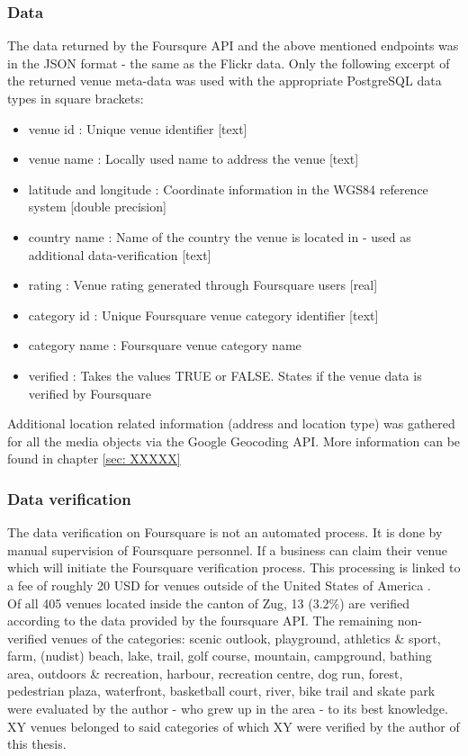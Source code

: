 \subsubsection{Data} \label{fq_data}
The data returned by the Foursqure API and the above mentioned endpoints was in the JSON format - the same as the Flickr data.
Only the following excerpt of the returned venue meta-data was used with the appropriate PostgreSQL data types in square brackets: \\
\begin{itemize}
    \item venue id : Unique venue identifier [text]
    \item venue name : Locally used name to address the venue [text]
    \item latitude and longitude : Coordinate information in the WGS84 reference system [double precision]
    \item country name : Name of the country the venue is located in - used as additional data-verification [text]
    \item rating : Venue rating generated through Foursquare users [real]
    \item category id : Unique Foursquare venue category identifier [text]
    \item category name : Foursquare venue category name
    \item verified : Takes the values TRUE or FALSE. States if the venue data is verified by Foursquare
\end{itemize}

Additional location related information (address and location type) was gathered for all the media objects via the Google Geocoding API. More information can be found in chapter \ref{sec: XXXXX}

\subsubsection{Data verification} \label{foursquare_data_verification}
The data verification on Foursquare is not an automated process. It is done by manual supervision of Foursquare personnel. If a business can claim their venue which will initiate the Foursquare verification process. This processing is linked to a fee of roughly 20 USD for venues outside of the United States of America \cite{Foursquare2019FoursquareClaim}. \\
Of all 405 venues located inside the canton of Zug, 13 (3.2\%) are verified according to the data provided by the foursquare API. The remaining non-verified venues of the categories: scenic outlook, playground, athletics & sport, farm, (nudist) beach, lake, trail, golf course, mountain, campground, bathing area, outdoors & recreation, harbour, recreation centre, dog run, forest, pedestrian plaza, waterfront, basketball court, river, bike trail and skate park were evaluated by the author - who grew up in the area - to its best knowledge. XY venues belonged to said categories of which XY were verified by the author of this thesis.

